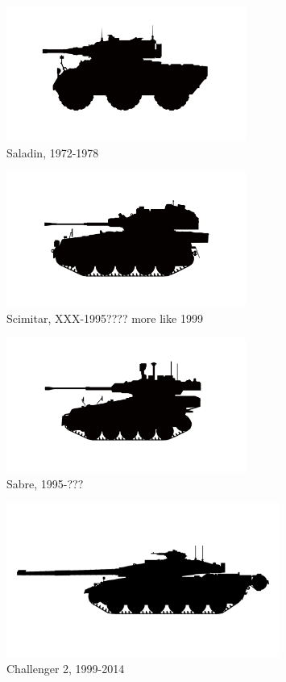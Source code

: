 \begin{figure}[h]
  \centering
  \includegraphics[width=0.7\textwidth]{platforms/saladin.pdf}
  \caption*{Saladin, 1972-1978}
\end{figure}

\begin{figure}[h]
  \centering
  \includegraphics[width=0.7\textwidth]{platforms/scimitar.pdf}
  \caption*{Scimitar, XXX-1995???? more like 1999}
\end{figure}

\begin{figure}[h]
  \centering
  \includegraphics[width=0.7\textwidth]{platforms/sabre.pdf}
  \caption*{Sabre, 1995-???}
\end{figure}

\begin{figure}[h]
  \centering
  \includegraphics[width=0.8\textwidth]{platforms/challenger.pdf}
  \caption*{Challenger 2, 1999-2014}
\end{figure}

